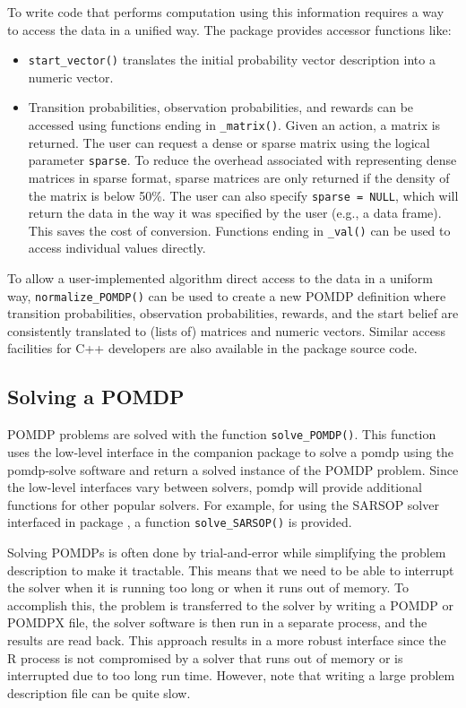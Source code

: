 To write code that performs computation using this information requires a way to access the data in a unified
way. The package provides accessor functions like:

\begin{itemize}
\item
  \texttt{start\_vector()} translates the initial probability vector description into a numeric vector.
\item
  Transition probabilities, observation probabilities, and rewards can be accessed using functions ending in \texttt{\_matrix()}.
  Given an action, a matrix is returned.
  The user can request a dense or sparse matrix using the logical parameter \texttt{sparse}.
  To reduce the overhead associated with representing dense matrices in sparse format, sparse matrices are only returned
  if the density of the matrix is below 50\%. The user can also specify \texttt{sparse\ =\ NULL},
  which will return the data in the way it was specified by the user (e.g., a data frame). This saves the cost of conversion.
  Functions ending in \texttt{\_val()} can be used to access individual values directly.
\end{itemize}

To allow a user-implemented algorithm direct access to the data in a uniform way, \texttt{normalize\_POMDP()} can be used to create a
new POMDP definition where transition probabilities, observation probabilities, rewards, and the start belief are
consistently translated to (lists of) matrices and numeric vectors. Similar access
facilities for C++ developers are also available in the package source code.

\hypertarget{solving-a-pomdp}{%
\subsection{Solving a POMDP}\label{solving-a-pomdp}}

POMDP problems are solved with the function \texttt{solve\_POMDP()}. This function uses the low-level interface in the companion package
 to solve a pomdp using the pomdp-solve software and return a solved instance of the POMDP problem.
Since the low-level interfaces vary between solvers, pomdp will provide additional functions for other popular solvers.
For example, for using the SARSOP solver interfaced in package , a function \texttt{solve\_SARSOP()} is provided.

Solving POMDPs is often done by trial-and-error while simplifying the problem description to make it
tractable. This means that we need to be able to interrupt the solver when it is running too long or
when it runs out of memory. To accomplish this, the problem is transferred to the solver
by writing a POMDP or POMDPX file, the solver software is then run in a separate process, and the results are read back. This approach results in a more robust interface since the R process is not compromised by a solver that runs out of memory or is interrupted due to too long run time. However, note that writing a large problem description file
can be quite slow.


